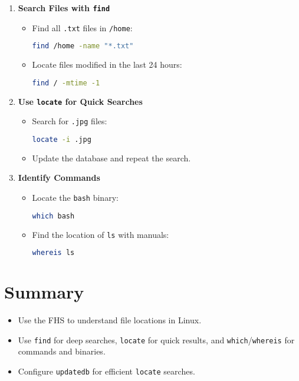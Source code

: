\documentclass[a4paper]{report}
\begin{document}
\begin{enumerate}
    \item \textbf{Search Files with \texttt{find}}
    \begin{itemize}
        \item Find all \texttt{.txt} files in \texttt{/home}:
        \begin{lstlisting}[language=bash]
find /home -name "*.txt"
        \end{lstlisting}
        \item Locate files modified in the last 24 hours:
        \begin{lstlisting}[language=bash]
find / -mtime -1
        \end{lstlisting}
    \end{itemize}

    \item \textbf{Use \texttt{locate} for Quick Searches}
    \begin{itemize}
        \item Search for \texttt{.jpg} files:
        \begin{lstlisting}[language=bash]
locate -i .jpg
        \end{lstlisting}
        \item Update the database and repeat the search.
    \end{itemize}

    \item \textbf{Identify Commands}
    \begin{itemize}
        \item Locate the \texttt{bash} binary:
        \begin{lstlisting}[language=bash]
which bash
        \end{lstlisting}
        \item Find the location of \texttt{ls} with manuals:
        \begin{lstlisting}[language=bash]
whereis ls
        \end{lstlisting}
    \end{itemize}
\end{enumerate}

\section*{Summary}
\begin{itemize}
    \item Use the FHS to understand file locations in Linux.
    \item Use \texttt{find} for deep searches, \texttt{locate} for quick results, and \texttt{which}/\texttt{whereis} for commands and binaries.
    \item Configure \texttt{updatedb} for efficient \texttt{locate} searches.
\end{itemize}
\end{document}
